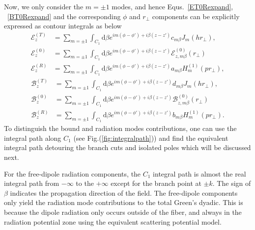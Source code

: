 \documentclass[]{report}
\begin{document}
Now, we only consider the $ m=\pm 1 $ modes, and hence Equs.~\ref{ET0Rexpand}, ~\ref{BT0Rexpand} and the corresponding $ \phi $ and $ r\!_\perp $ components can be explicitly expressed as contour integrals as below
\begin{subequations}\label{ET0RC1}
\begin{align}
\mathcal{E}^{(T)}_z &= \sum_{m=\pm 1} \int_{C_1} \mathrm{d}\beta e^{im(\phi-\phi') + i\beta (z-z')} c_{m\beta} J_m (hr\!_\perp),\\
\mathcal{E}^{(0)}_{z} &= \sum_{m=\pm 1} \int_{C_1} \mathrm{d}\beta e^{im(\phi-\phi') + i\beta (z-z')} \mathcal{E}^{(0)}_{z,m\beta}(r\!_\perp)\\
\mathcal{E}^{(R)}_z &= \sum_{m=\pm 1} \int_{C_1} \mathrm{d}\beta e^{im(\phi-\phi') + i\beta (z-z')} a_{m\beta} H_m^{(1)} (pr\!_\perp),
\end{align}
\end{subequations}
\begin{subequations}\label{BT0RC1}
\begin{align}
\mathcal{B}^{(T)}_z &= \sum_{m=\pm 1} \int_{C_1} \mathrm{d}\beta e^{im(\phi-\phi') + i\beta (z-z')} d_{m\beta} J_m (hr\!_\perp),\\
\mathcal{B}^{(0)}_{z} &= \sum_{m=\pm 1} \int_{C_1} \mathrm{d}\beta e^{im(\phi-\phi') + i\beta (z-z')} \mathcal{B}^{(0)}_{z,m\beta}(r\!_\perp)\\
\mathcal{B}^{(R)}_z &= \sum_{m=\pm 1} \int_{C_1} \mathrm{d}\beta e^{im(\phi-\phi') + i\beta (z-z')} b_{m\beta} H_m^{(1)} (pr\!_\perp).
\end{align}
\end{subequations}
To distinguish the bound and radiation modes contributions, one can use the integral path along $ C_1 $ (see Fig.(\ref{fig:integralpath})) and find the equivalent integral path detouring the branch cuts and isolated poles which will be discussed next. 

For the free-dipole radiation components, the $ C_1 $ integral path is almost the real integral path from $ -\infty $ to the $ +\infty $ except for the branch point at $ \pm k $. The sign of $ \beta $ indicates the propagation direction of the field. The free-dipole components only yield the radiation mode contributions to the total Green's dyadic. This is because the dipole radiation only occurs outside of the fiber, and always in the radiation potential zone using the equivalent scattering potential model. 
\end{document}
